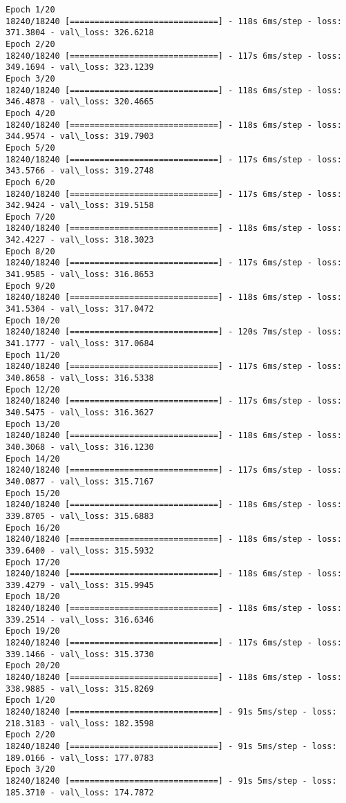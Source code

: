 \documentclass[11pt]{article}
\begin{document}
    \begin{Verbatim}[commandchars=\\\{\}]
Epoch 1/20
18240/18240 [==============================] - 118s 6ms/step - loss: 371.3804 - val\_loss: 326.6218
Epoch 2/20
18240/18240 [==============================] - 117s 6ms/step - loss: 349.1694 - val\_loss: 323.1239
Epoch 3/20
18240/18240 [==============================] - 118s 6ms/step - loss: 346.4878 - val\_loss: 320.4665
Epoch 4/20
18240/18240 [==============================] - 118s 6ms/step - loss: 344.9574 - val\_loss: 319.7903
Epoch 5/20
18240/18240 [==============================] - 117s 6ms/step - loss: 343.5766 - val\_loss: 319.2748
Epoch 6/20
18240/18240 [==============================] - 117s 6ms/step - loss: 342.9424 - val\_loss: 319.5158
Epoch 7/20
18240/18240 [==============================] - 118s 6ms/step - loss: 342.4227 - val\_loss: 318.3023
Epoch 8/20
18240/18240 [==============================] - 117s 6ms/step - loss: 341.9585 - val\_loss: 316.8653
Epoch 9/20
18240/18240 [==============================] - 118s 6ms/step - loss: 341.5304 - val\_loss: 317.0472
Epoch 10/20
18240/18240 [==============================] - 120s 7ms/step - loss: 341.1777 - val\_loss: 317.0684
Epoch 11/20
18240/18240 [==============================] - 117s 6ms/step - loss: 340.8658 - val\_loss: 316.5338
Epoch 12/20
18240/18240 [==============================] - 117s 6ms/step - loss: 340.5475 - val\_loss: 316.3627
Epoch 13/20
18240/18240 [==============================] - 118s 6ms/step - loss: 340.3068 - val\_loss: 316.1230
Epoch 14/20
18240/18240 [==============================] - 117s 6ms/step - loss: 340.0877 - val\_loss: 315.7167
Epoch 15/20
18240/18240 [==============================] - 118s 6ms/step - loss: 339.8705 - val\_loss: 315.6883
Epoch 16/20
18240/18240 [==============================] - 118s 6ms/step - loss: 339.6400 - val\_loss: 315.5932
Epoch 17/20
18240/18240 [==============================] - 118s 6ms/step - loss: 339.4279 - val\_loss: 315.9945
Epoch 18/20
18240/18240 [==============================] - 118s 6ms/step - loss: 339.2514 - val\_loss: 316.6346
Epoch 19/20
18240/18240 [==============================] - 117s 6ms/step - loss: 339.1466 - val\_loss: 315.3730
Epoch 20/20
18240/18240 [==============================] - 118s 6ms/step - loss: 338.9885 - val\_loss: 315.8269
Epoch 1/20
18240/18240 [==============================] - 91s 5ms/step - loss: 218.3183 - val\_loss: 182.3598
Epoch 2/20
18240/18240 [==============================] - 91s 5ms/step - loss: 189.0166 - val\_loss: 177.0783
Epoch 3/20
18240/18240 [==============================] - 91s 5ms/step - loss: 185.3710 - val\_loss: 174.7872

\end{Verbatim}
\end{document}
